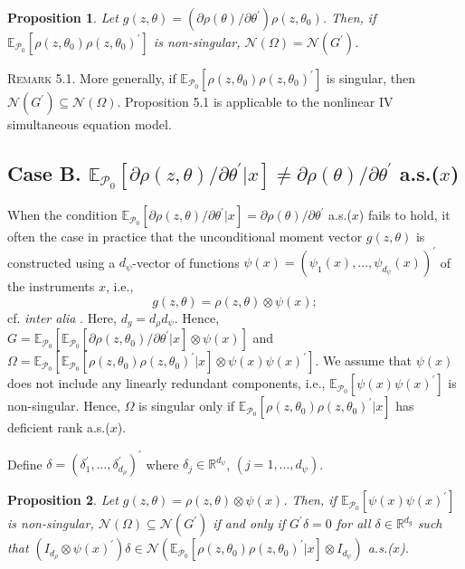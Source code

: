 \documentclass[hidelinks, 11 pt, a4paper, pdflatex]{article}
\newtheorem{proposition}{Proposition}[section]
\begin{document}
{   \begin{proposition}
    Let $g(z,\theta) = (\partial \rho(\theta)/\partial \theta^{\prime})\rho(z,\theta_{0})$. Then, if $\mathbb{E}_{\mathcal{P}_{0}}[\rho(z,\theta_{0})\rho(z,\theta_{0})^{\prime }]$ is non-singular, $\mathcal{N}(\Omega) = \mathcal{N}(G^{\prime})$.
   \end{proposition}

   \textsc{Remark 5.1}. More generally, if $\mathbb{E}_{\mathcal{P}_{0}}[\rho(z,\theta_{0})\rho(z,\theta_{0})^{\prime}]$ is singular, then $\mathcal{N}(G^{\prime}) \subseteq
    \mathcal{N}(\Omega)$. Proposition 5.1 is applicable to the nonlinear IV simultaneous equation model.


  \subsection{Case B. $\mathbb{E}_{\mathcal{P}_{0}}[\partial \rho (z,\theta )/\partial \theta^{\prime}|x] \neq \partial \rho(\theta)/\partial \theta^{\prime}$ a.s.($x$)}

   When the condition $\mathbb{E}_{\mathcal{P}_{0}}[\partial \rho(z,\theta)/\partial \theta^{\prime}|x] = \partial \rho(\theta)/\partial \theta^{\prime}$ a.s.($x$) fails to hold, it often the case in practice that the unconditional moment vector $g(z,\theta)$ is constructed using a $d_{\psi}$-vector of functions $\psi(x) = (\psi_{1}(x),...,\psi_{d_{\psi}}(x))^{\prime}$ of the instruments $x$, i.e.,
    \[
     g(z,\theta) = \rho(z,\theta) \otimes \psi(x);
    \]
   cf. \textit{inter alia} \cite{jorgenson1974}. Here, $d_{g} = d_{\rho}d_{\psi}$. Hence, $G = \mathbb{E}_{\mathcal{P}_{0}}[\mathbb{E}_{\mathcal{P}_{0}}[\partial \rho(z,\theta_{0})/\partial \theta^{\prime}|x] \otimes \psi(x)]$ and $\Omega = \mathbb{E}_{\mathcal{P}_{0}}[\mathbb{E}_{\mathcal{P}_{0}}[\rho(z,\theta_{0})\rho(z,\theta_{0})^{\prime}|x] \otimes \psi(x)\psi(x)^{\prime}]$. We assume that $\psi(x)$ does not include any linearly redundant components, i.e., $\mathbb{E}_{\mathcal{P}_{0}}[\psi(x)\psi (x)^{\prime}]$ is non-singular. Hence, $\Omega$ is singular only if $\mathbb{E}_{\mathcal{P}_{0}}[\rho(z,\theta_{0})\rho(z,\theta_{0})^{\prime}|x]$ has deficient rank a.s.($x$).

   Define $\delta = (\delta_1^{\prime},\ldots,\delta_{d_{\rho}}^{\prime})^{\prime}$ where $\delta_j \in \mathbb{R}^{d_{\psi}}$, $(j=1,\ldots,d_{\psi})$.
    \begin{proposition}
     Let $g(z,\theta) = \rho(z,\theta) \otimes \psi(x)$. Then, if $\mathbb{E}_{\mathcal{P}_{0}}[\psi(x)\psi(x)^{\prime}]$ is non-singular, $\mathcal{N}(\Omega) \subseteq \mathcal{N}(G^{\prime})$ if and only if $G^{\prime}\delta = 0$ for all $\delta \in \mathbb{R}^{d_g}$ such that $(I_{d_\rho} \otimes \psi(x)^{\prime})\delta \in \mathcal{N}(\mathbb{E}_{\mathcal{P}_{0}}[\rho(z,\theta_{0})\rho(z,\theta_{0})^{\prime}|x] \otimes I_{d_\psi})$ a.s.($x$).
    \end{proposition}

}
\end{document}
